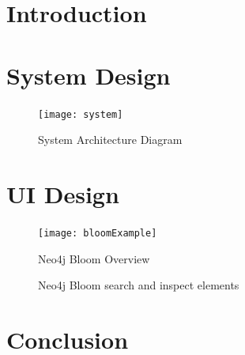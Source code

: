 \section{Introduction}
\section{System Design}
\begin{figure}[h]
    \centering
    \texttt{[image: system]}
    \caption{System Architecture Diagram}
\end{figure}
\section{UI Design}
\begin{figure}[H]
    \centering
    \texttt{[image: bloomExample]}
    \caption{Neo4j Bloom Overview}
\end{figure}
\begin{figure}[H]%
    \centering
    \qquad
    \caption{Neo4j Bloom search and inspect elements}
\end{figure}
\section{Conclusion}